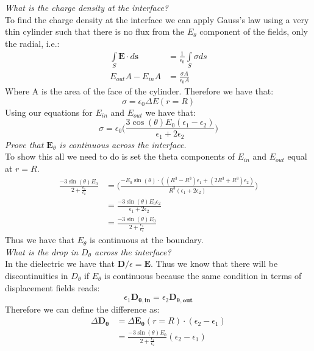 \documentclass[a4paper, 11pt]{article}
\begin{document}
\noindent\textit{What is the charge density at the interface?}\\

\noindent To find the charge density at the interface we can apply Gauss's law using a very thin cylinder such that there is no flux from the $E_{\theta}$ component of the fields, only the radial, i.e.: 
	\begin{align*}
		\int\limits_S \mathbf{E}\cdot d\mathbf{s} &= \frac{1}{\epsilon_0}\int\limits_S \sigma ds\\
		E_{out}A-E_{in}A &= \frac{\sigma A}{\epsilon_0 A}
	\end{align*}
Where A is the area of the face of the cylinder. Therefore we have that: 
	\begin{equation*}
		\sigma = \epsilon_0 \Delta E(r=R)
	\end{equation*}
Using our equations for $E_{in}$ and $E_{out}$ we have that: 
	\begin{equation}
		\sigma = \epsilon_0 \Bigg( \frac{3\cos(\theta)E_0(\epsilon_1-\epsilon_2)}{\epsilon_1+2\epsilon_2}\Bigg)
	\end{equation}
\noindent\textit{Prove that $\mathbf{E}_{\theta}$ is continuous across the interface.} \\

\noindent To show this all we need to do is set the theta components of $E_{in}$ and $E_{out}$ equal at $r=R$. 
	\begin{align*}
		 \frac{-3\sin(\theta)E_0}{2+\frac{\epsilon_1}{\epsilon_2}} &=\Bigg(\frac{-E_0\sin(\theta)\cdot((R^3-R^3)\epsilon_1+(2R^3+R^3)\epsilon_2)}{R^3(\epsilon_1+2\epsilon_2)} \Bigg) \\
		 &= \frac{-3\sin(\theta)E_0\epsilon_2}{\epsilon_1+2\epsilon_2}\\
		 &= \frac{-3\sin(\theta)E_0}{2+\frac{\epsilon_1}{\epsilon_2}}
	\end{align*}
Thus we have that $E_{\theta}$ is continuous at the boundary. \\

\noindent\textit{What is the drop in $D_{\theta}$ across the interface?} \\ 

\noindent In the dielectric we have that $\textbf{D}/\epsilon = \textbf{E}$. Thus we know that there will be discontinuities in $D_{\theta}$ if $E_{\theta}$ is continuous because the same condition in terms of displacement fields reads: 
	\begin{equation*}
		\epsilon_1 \mathbf{D_{\theta,\text{in}}} = \epsilon_2 \mathbf{D_{\theta,\text{out}}}
	\end{equation*}
Therefore we can define the difference as: 
	\begin{align*}
		\Delta \mathbf{D_{\theta}} &= \Delta\mathbf{E_{\theta}}(r=R)\cdot(\epsilon_2-\epsilon_1) \\
		&=\frac{-3\sin(\theta)E_0}{2+\frac{\epsilon_1}{\epsilon_2}}(\epsilon_2-\epsilon_1)
	\end{align*}
	
\end{document}
